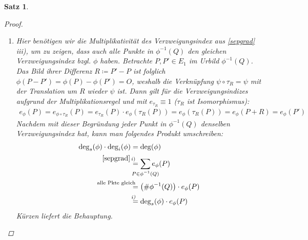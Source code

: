 \documentclass[english, german, parskip=half]{scrartcl}
\newtheorem{Satz}{Satz}[section]
\theoremstyle{definition}
\theoremstyle{remark}
\newcommand*{\degs}{\operatorname{\deg}_s} %
\newcommand*{\degi}{\operatorname{\deg}_i} %
\begin{document}
\begin{Satz}
\begin{proof}
\begin{enumerate}[label=\roman*)]
  \item Hier benötigen wir die Multiplikativität des Verzweigungsindex
    aus \autoref{sepgrad}\,iii), um zu zeigen, dass auch alle Punkte
    in $\phi^{-1}(Q)$ den gleichen Verzweigungsindex bzgl. $\phi$ haben.
    Betrachte $P,P'\in E_1$ im Urbild $\phi^{-1}(Q)$. Das Bild ihrer
    Differenz $R\coloneqq P'-P$ ist folglich
    $\phi(P-P')=\phi(P)-\phi(P')=O$, weshalb die Verknüpfung
    $\psi\circ\tau_R = \psi$ mit der Translation um $R$ wieder $\psi$
    ist.
    Dann gilt für die Verzweigungsindizes aufgrund der
    Multiplikationsregel und mit $e_{\tau_R}\equiv1$ ($\tau_R$ ist
    Isomorphismus):
    \begin{gather*}
      e_\phi(P) 
      = e_{\phi\circ\tau_R}(P) 
      = e_{\tau_R}(P) \cdot e_\phi(\tau_R(P))
      = e_\phi(\tau_R(P))
      = e_\phi(P+R)
      = e_\phi(P')
    \end{gather*}
    Nachdem mit dieser Begründung jeder Punkt in $\phi^{-1}(Q)$
    denselben Verzweigungsindex hat, kann man folgendes Produkt
    umschreiben:
    \begin{align*}
      \degs(\phi) \cdot \degi(\phi)
      &= \deg(\phi)\\
      &\overset{\mathllap{\ref{sepgrad}\,i)}}{=}
        \sum_{\mathclap{P\in\phi^{-1}(Q)}} e_\phi(P)\\
      &\overset{\mathllap{\text{alle Pkte gleich}}}{=}
        \left( \#\phi^{-1}(Q) \right) \cdot e_\phi(P)\\
      &\overset{\mathllap{\text{\emph{i)}}}}{=}
        \degs(\phi)\cdot e_\phi(P)
    \end{align*}
    Kürzen liefert die Behauptung.
  \end{enumerate}  
\end{proof}
\end{Satz}
\end{document}
